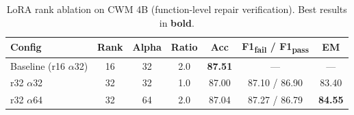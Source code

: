 \begin{table}[t]
\centering
\caption{LoRA rank ablation on CWM 4B (function-level repair verification). Best results in \textbf{bold}.}
\label{tab:rank-ablation}
\begin{tabular}{lcccccc}
\toprule
\textbf{Config} & \textbf{Rank} & \textbf{Alpha} & \textbf{Ratio} & \textbf{Acc} & \textbf{F1\textsubscript{fail} / F1\textsubscript{pass}} & \textbf{EM} \\
\midrule
Baseline (r16 $\alpha$32) & 16 & 32 & 2.0 & \textbf{87.51} & --- & --- \\
r32 $\alpha$32             & 32 & 32 & 1.0 & 87.00          & 87.10 / 86.90 & 83.40 \\
r32 $\alpha$64             & 32 & 64 & 2.0 & 87.04          & 87.27 / 86.79 & \textbf{84.55} \\
\bottomrule
\end{tabular}
\end{table}
